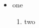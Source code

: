 \begin{itemize}
	\item one
	      \begin{enumerate}[label=(\alph*)]
		      \item two
	      \end{enumerate}
\end{itemize}
